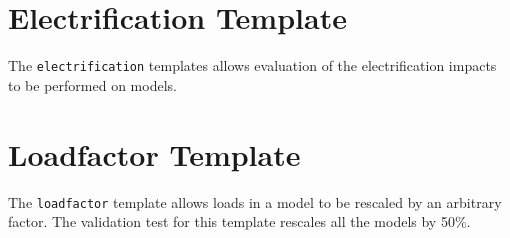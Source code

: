 \documentclass{article}
\def\code#1{\texttt{#1}}
\begin{document}



\section{Electrification Template}

The \code{electrification} templates allows evaluation of the electrification impacts to be performed on models.




\section{Loadfactor Template}

The \code{loadfactor} template allows loads in a model to be rescaled by an arbitrary factor. The validation test for this template rescales all the models by 50\%.


\end{document}
